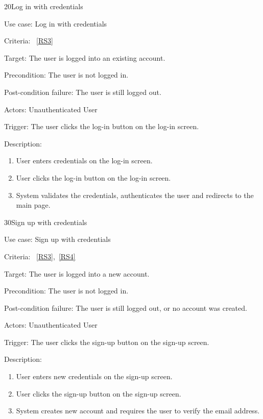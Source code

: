 \vspace{2.0em}

\begin{function}{20}{Log in with credentials}
	\item[Use case:] Log in with credentials
	\item[Criteria:]~\ref{RS3}
	\item[Target:] The user is logged into an existing account.
	\item[Precondition:] The user is not logged in.
	\item[Post-condition failure:] The user is still logged out.
	\item[Actors:] Unauthenticated User
	\item[Trigger:] The user clicks the log-in button on the log-in screen.
	\item[Description:] ~
	\begin{enumerate}
		\item User enters credentials on the log-in screen.
		\item User clicks the log-in button on the log-in screen.
		\item System validates the credentials, authenticates the user and redirects to the main page.
	\end{enumerate}
\end{function}

\vspace{2.0em}

\begin{function}{30}{Sign up with credentials}
	\item[Use case:] Sign up with credentials
	\item[Criteria:]~\ref{RS3},~\ref{RS4}
	\item[Target:] The user is logged into a new account.
	\item[Precondition:] The user is not logged in.
	\item[Post-condition failure:] The user is still logged out, or no account was created.
	\item[Actors:] Unauthenticated User
	\item[Trigger:] The user clicks the sign-up button on the sign-up screen.
	\item[Description:] ~
\begin{enumerate}
	\item User enters new credentials on the sign-up screen.
	\item User clicks the sign-up button on the sign-up screen.
	\item System creates new account and requires the user to verify the email address.
\end{enumerate}
\end{function}

